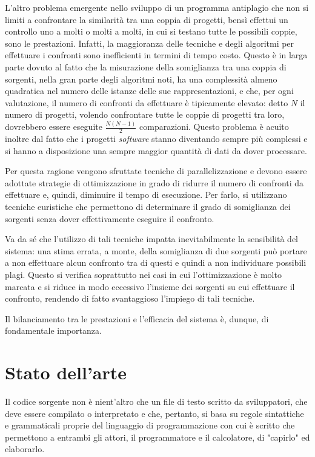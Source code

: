 L'altro problema emergente nello sviluppo di un programma antiplagio che non si limiti a confrontare la similarità tra una coppia di progetti, bensì effettui un controllo uno a molti o molti a molti, in cui si testano tutte le possibili coppie, sono le prestazioni. 
%
Infatti, la maggioranza delle tecniche e degli algoritmi per effettuare i confronti sono inefficienti in termini di tempo costo. 
%
Questo è in larga parte dovuto al fatto che la misurazione della somiglianza tra una coppia di sorgenti, nella gran parte degli algoritmi noti, ha una complessità almeno quadratica nel numero delle istanze delle sue rappresentazioni, e che, per ogni valutazione, il numero di confronti da effettuare è tipicamente elevato: detto $N$ il numero di progetti, volendo confrontare tutte le coppie di progetti tra loro, dovrebbero essere eseguite $\frac{N(N-1)}{2}$ comparazioni.
%
Questo problema è acuito inoltre dal fatto che i progetti \textit{software} stanno diventando sempre più complessi e si hanno a disposizione una sempre maggior quantità di dati da dover processare.

Per questa ragione vengono sfruttate tecniche di parallelizzazione e devono essere adottate strategie di ottimizzazione in grado di ridurre il numero di confronti da effettuare e, quindi, diminuire il tempo di esecuzione.
%
Per farlo, si utilizzano tecniche euristiche che permettono di determinare il grado di somiglianza dei sorgenti senza dover effettivamente eseguire il confronto.

Va da sé che l'utilizzo di tali tecniche impatta inevitabilmente la sensibilità del sistema: una stima errata, a monte, della somiglianza di due sorgenti può portare a non effettuare alcun confronto tra di questi e quindi a non individuare possibili plagi. 
%
Questo si verifica soprattutto nei casi in cui l'ottimizzazione è molto marcata e si riduce in modo eccessivo l'insieme dei sorgenti su cui effettuare il confronto, rendendo di fatto svantaggioso l'impiego di tali tecniche.

Il bilanciamento tra le prestazioni e l'efficacia del sistema è, dunque, di fondamentale importanza.


\section{Stato dell'arte}

Il codice sorgente non è nient'altro che un file di testo scritto da sviluppatori, che deve essere compilato o interpretato e che, pertanto, si basa su regole sintattiche e grammaticali proprie del linguaggio di programmazione con cui è scritto che permettono a entrambi gli attori, il programmatore e il calcolatore, di "capirlo" ed elaborarlo.

